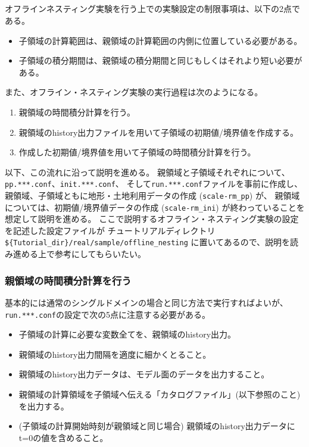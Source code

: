 \subsection{\SubsecOflineNesting} \label{subsec:nest_offline}

オフラインネスティング実験を行う上での実験設定の制限事項は、以下の2点である。
\begin{itemize}
 \item 子領域の計算範囲は、親領域の計算範囲の内側に位置している必要がある。
 \item 子領域の積分期間は、親領域の積分期間と同じもしくはそれより短い必要がある。
\end{itemize}

また、オフライン・ネスティング実験の実行過程は次のようになる。
{\gt
\begin{enumerate}
 \item 親領域の時間積分計算を行う。
 \item 親領域のhistory出力ファイルを用いて子領域の初期値/境界値を作成する。
 \item 作成した初期値/境界値を用いて子領域の時間積分計算を行う。
\end{enumerate}
}

以下、この流れに沿って説明を進める。
親領域と子領域それぞれについて、\verb|pp.***.conf|、\verb|init.***.conf|、
そして\verb|run.***.conf|ファイルを事前に作成し、
親領域、子領域ともに地形・土地利用データの作成 (\verb|scale-rm_pp|) が、
親領域については、初期値/境界値データの作成 (\verb|scale-rm_ini|) が終わっていることを想定して説明を進める。
ここで説明するオフライン・ネスティング実験の設定を記述した設定ファイルが
チュートリアルディレクトリ\verb|${Tutorial_dir}/real/sample/offline_nesting|
に置いてあるので、説明を読み進める上で参考にしてもらいたい。

\subsubsection{親領域の時間積分計算を行う}
基本的には通常のシングルドメインの場合と同じ方法で実行すればよいが、
\verb|run.***.conf|の設定で次の5点に注意する必要がある。

\begin{itemize}
 \item 子領域の計算に必要な変数全てを、親領域のhistory出力。
 \item 親領域のhistory出力間隔を適度に細かくとること。
 \item 親領域のhistory出力データは、モデル面のデータを出力すること。
 \item 親領域の計算領域を子領域へ伝える「カタログファイル」(以下参照のこと)を出力する。
 \item (子領域の計算開始時刻が親領域と同じ場合) 親領域のhistory出力データにt=0の値を含めること。
\end{itemize}


